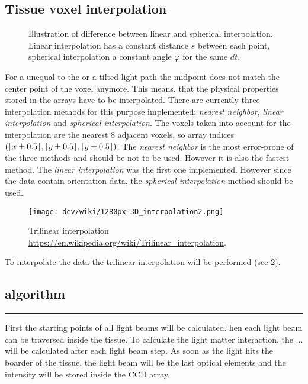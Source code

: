 \subsection{Tissue voxel interpolation}
% 
\begin{figure}[!t]
\centering
\def\tikzwidth{0.75*\textwidth}
\tikzset{external/export=false}
\caption[Illustration linear and spherical interpolation.]{Illustration of difference between linear and spherical interpolation. Linear interpolation has a constant distance $s$ between each point, spherical interpolation a constant angle $\varphi$ for the same $dt$.}
\label{fig:vectorfield_disc}
\end{figure}
% 
For a \stepsize{} unequal to the \voxelsize{} or a tilted light path the midpoint does not match the center point of the voxel anymore.
This means, that the physical properties stored in the arrays have to be interpolated.
There are currently three interpolation methods for this purpose implemented: \textit{nearest neighbor}, \textit{linear interpolation} and \textit{spherical interpolation}. 
The voxels taken into account for the interpolation are the nearest 8 adjacent voxels, so array indices $(\lfloor x\pm0.5\rfloor,\lfloor y\pm0.5\rfloor,\lfloor y\pm0.5\rfloor)$.
% 
The \textit{nearest neighbor} is the most error-prone of the three methods and should be not to be used. 
However it is also the fastest method.
The \textit{linear interpolation} was the first one implemented.
However since the data contain orientation data, the \textit{spherical interpolation} method should be used.
\\
% 
\begin{figure}[!t]
\centering
\texttt{[image: dev/wiki/1280px-3D\_interpolation2.png]}
\caption[Trilinear interpolation]{Trilinear interpolation \url{https://en.wikipedia.org/wiki/Trilinear\_interpolation}.}
\label{fig:triInterp}
\end{figure}
% 
To interpolate the data the trilinear interpolation will be performed (see \cref{fig:triInterp}).
% 
% 
\subsection{algorithm}
% 
\par
\noindent\rule{\textwidth}{2pt}
\par
% 
First the starting points of all light beams will be calculated.
hen each light beam can be traversed inside the tissue.
To calculate the light matter interaction, the ... will be calculated after each light beam step.
As soon as the light hits the boarder of the tissue, the light beam will be the last optical elements and the intensity will be stored inside the \ac{CCD} array.
% 
% 
% 
